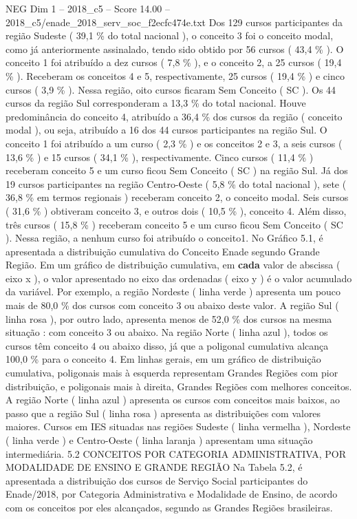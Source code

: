 \begin{textsample}{NEG Dim 1 – 2018\_c5 – Score 14.00 – 2018\_c5/enade\_2018\_serv\_soc\_f2ecfc474e.txt}
Dos 129 cursos participantes da região Sudeste ( 39,1 \% do total nacional ), o conceito 3 foi o conceito modal, como já anteriormente assinalado, tendo sido obtido por 56 cursos ( 43,4 \% ).
O conceito 1 foi atribuído a dez cursos ( 7,8 \% ), e o conceito 2, a 25 cursos ( 19,4 \% ).
Receberam os conceitos 4 e 5, respectivamente, 25 cursos ( 19,4 \% ) e cinco cursos ( 3,9 \% ).
Nessa região, oito cursos ficaram Sem Conceito ( SC ).
Os 44 cursos da região Sul corresponderam a 13,3 \% do total nacional.
Houve predominância do conceito 4, atribuído a 36,4 \% dos cursos da região ( conceito modal ), ou seja, atribuído a 16 dos 44 cursos participantes na região Sul.
O conceito 1 foi atribuído a um curso ( 2,3 \% ) e os conceitos 2 e 3, a seis cursos ( 13,6 \% ) e 15 cursos ( 34,1 \% ), respectivamente.
Cinco cursos ( 11,4 \% ) receberam conceito 5 e um curso ficou Sem Conceito ( SC ) na região Sul.
Já dos 19 cursos participantes na região Centro-Oeste ( 5,8 \% do total nacional ), sete ( 36,8 \% em termos regionais ) receberam conceito 2, o conceito modal.
Seis cursos ( 31,6 \% ) obtiveram conceito 3, e outros dois ( 10,5 \% ), conceito 4.
Além disso, três cursos ( 15,8 \% ) receberam conceito 5 e um curso ficou Sem Conceito ( SC ).
Nessa região, a nenhum curso foi atribuído o conceito1.
No Gráfico 5.1, é apresentada a distribuição cumulativa do Conceito Enade segundo Grande Região.
Em um gráfico de distribuição cumulativa, em \textbf{cada} valor de abscissa ( eixo x ), o valor apresentado no eixo das ordenadas ( eixo y ) é o valor acumulado da variável.
Por exemplo, a região Nordeste ( linha verde ) apresenta um pouco mais de 80,0 \% dos cursos com conceito 3 ou abaixo deste valor.
A região Sul ( linha rosa ), por outro lado, apresenta menos de 52,0 \% dos cursos na mesma situação : com conceito 3 ou abaixo.
Na região Norte ( linha azul ), todos os cursos têm conceito 4 ou abaixo disso, já que a poligonal cumulativa alcança 100,0 \% para o conceito 4.
Em linhas gerais, em um gráfico de distribuição cumulativa, poligonais mais à esquerda representam Grandes Regiões com pior distribuição, e poligonais mais à direita, Grandes Regiões com melhores conceitos.
A região Norte ( linha azul ) apresenta os cursos com conceitos mais baixos, ao passo que a região Sul ( linha rosa ) apresenta as distribuições com valores maiores.
Cursos em IES situadas nas regiões Sudeste ( linha vermelha ), Nordeste ( linha verde ) e Centro-Oeste ( linha laranja ) apresentam uma situação intermediária. 5.2 CONCEITOS POR CATEGORIA ADMINISTRATIVA, POR MODALIDADE DE ENSINO E GRANDE REGIÃO Na Tabela 5.2, é apresentada a distribuição dos cursos de Serviço Social participantes do Enade/2018, por Categoria Administrativa e Modalidade de Ensino, de acordo com os conceitos por eles alcançados, segundo as Grandes Regiões brasileiras.

\end{textsample}
